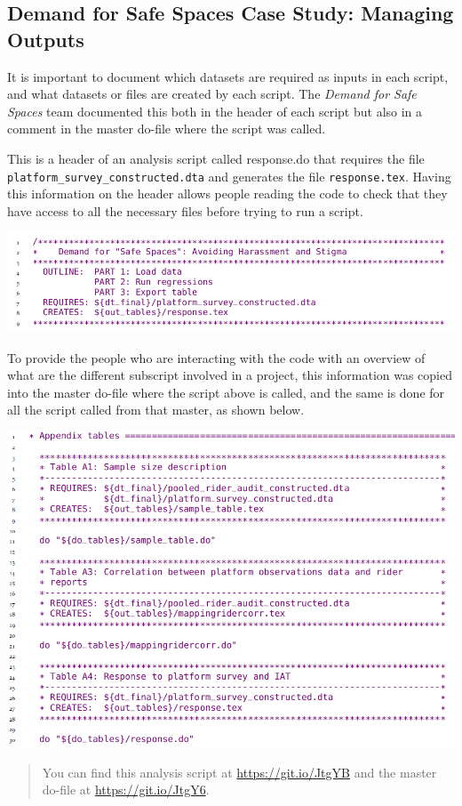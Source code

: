 \documentclass[
]{book}
\begin{document}
\begin{ex}
\hypertarget{demand-for-safe-spaces-case-study-managing-outputs}{%
\subsection{Demand for Safe Spaces Case Study: Managing Outputs}\label{demand-for-safe-spaces-case-study-managing-outputs}}

It is important to document which datasets are required as inputs in each script, and what datasets or files are created by each script. The \emph{Demand for Safe Spaces} team documented this both in the header of each script but also in a comment in the master do-file where the script was called.

This is a header of an analysis script called response.do that requires the file \texttt{platform\_survey\_constructed.dta} and generates the file \texttt{response.tex}. Having this information on the header allows people reading the code to check that they have access to all the necessary files before trying to run a script.

\includegraphics{examples/ch6-managing-outputs.png}

To provide the people who are interacting with the code with an overview of what are the different subscript involved in a project, this information was copied into the master do-file where the script above is called, and the same is done for all the script called from that master, as shown below.

\includegraphics{examples/ch6-managing-outputs2.png}

\begin{quote}
You can find this analysis script at \url{https://git.io/JtgYB} and the master do-file at \url{https://git.io/JtgY6}.
\end{quote}
\end{ex}
\end{document}
